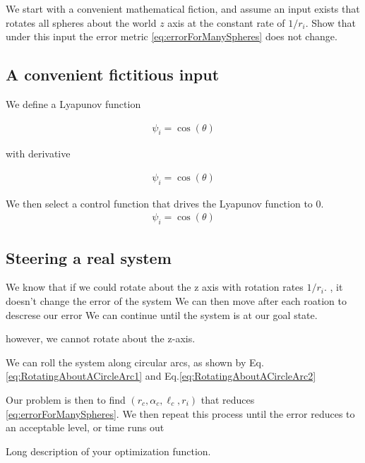 \documentclass[letter paper, 10pt, conference]{ieeeconf}
\newcommand{\todo}[1]{\vspace{5 mm}\par \noindent \framebox{\begin{minipage}[c]{0.98 \columnwidth} \ttfamily\flushleft \textcolor{red}{#1}\end{minipage}}\vspace{5 mm}\par}
\begin{document}
We start with a convenient mathematical fiction, and assume an input exists that rotates all spheres about the world $z$ axis at the constant rate of $1/r_i$.  
Show that under this input the error metric \eqref{eq:errorForManySpheres} does not change.

\subsection{A convenient fictitious input}

We define a Lyapunov function

\begin{align}
\psi_i = \cos( \theta) \label{eq:MultipleSphereLyapunov}
\end{align}

with derivative

\begin{align}
\psi_i = \cos( \theta) \label{eq:MultipleSphereLyapunovDerivative}
\end{align}

We then select a control function that drives the Lyapunov function to 0.
\begin{align}
\psi_i = \cos( \theta) \label{eq:ControlLyapunovFunction}
\end{align}

\subsection{Steering a real system}

We know that if we could rotate about the z axis with rotation rates $1/r_i$.  , it doesn't change the error of the system
We can then move after each roation to descrese our error 
We can continue until the system is at our goal state.
 
 
however, we cannot rotate about the z-axis.

We can roll the system along circular arcs, as shown by Eq. \eqref{eq:RotatingAboutACircleArc1} and Eq.\eqref{eq:RotatingAboutACircleArc2}


Our problem is then to find $(r_c, \alpha_c, \ell_c, r_i)  $ that reduces \eqref{eq:errorForManySpheres}.  We then repeat this process until the error reduces to an acceptable level, or time runs out


\todo{Some plots of this.}


Long description of your optimization function.




\end{document}

